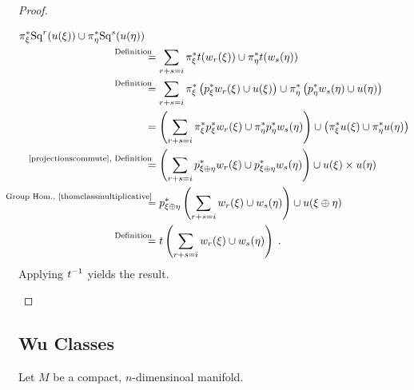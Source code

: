 \begin{Thm}
\begin{proof}
\begin{description}
\begin{align*}
          \pb\pi_\xi\Sq r(\u(\xi)) \cup \pb \pi_\eta\Sq s(\u(\eta)) \\
        &\overset{\mathllap{\text{Definition}}}=
          \sum_{r+s=i}
          \pb\pi_\xi\thomiso(\w_r(\xi))
          \cup \pb\pi_\eta\thomiso(\w_s(\eta)) \\
        &\overset{\mathllap{\text{Definition}}}=
          \sum_{r+s=i}
          \pb\pi_\xi \left(\pb p_\xi  \w_r(\xi)  \cup \u(\xi) \right)
          \cup
          \pb\pi_\eta\left(\pb p_\eta \w_s(\eta) \cup \u(\eta)\right) \\
        &= \left(
          \sum_{r+s=i}
          \pb\pi_\xi \pb p_\xi \w_r(\xi) \cup
          \pb\pi_\eta\pb p_\eta\w_s(\eta)
          \right)
          \cup
          \left(\pb\pi_\xi\u(\xi) \cup \pb\pi_\eta\u(\eta)\right) \\
        &\overset{\mathllap{\text{\eqref{projectionscommute}, Definition}}}=
          \left(\sum_{r+s=i}
          \pb p_{\xi\oplus\eta} \w_r(\xi) \cup \pb p_{\xi\oplus\eta} \w_s(\eta)
          \right)
          \cup
          \u(\xi) \times \u(\eta) \\
        &\overset{\mathllap{\text{Group Hom., \ref{thomclassmultiplicative}}}}=
          \pb p_{\xi\oplus\eta}
          \left(\sum_{r+s=i}\w_r(\xi)\cup\w_s(\eta)\right)
          \cup
          \u(\xi\oplus\eta)\\
        &\overset{\mathllap{\text{Definition}}}=
          \thomiso\left(\sum_{r+s=i}\w_r(\xi)\cup\w_s(\eta)\right)
          \;.
      \end{align*}
      Applying $t^{-1}$ yields the result.
      \qedhere
    \end{description}
  \end{proof}
\end{Thm}

\subsection{Wu Classes}
Let $M$ be a compact, $n$-dimensinoal manifold.

